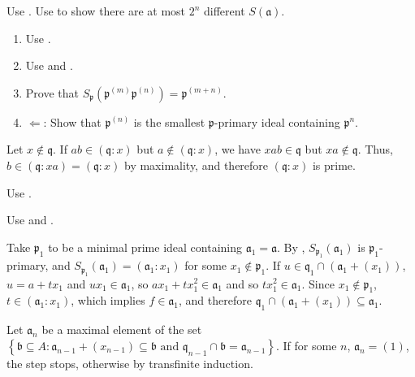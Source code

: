 \begin{exercise}\label{ex4.12}
	Use . Use  to show there are at most $2^n$ different $S(\mathfrak{a})$.
\end{exercise}

\begin{exercise}\label{ex4.13}
	\begin{enumerate}[label=(\roman*),ref=\theexercise(\roman*)]
		\item Use .
		\item Use  and .
		\item Prove that $S_\mathfrak{p}\left(\mathfrak{p}^{(m)}\mathfrak{p}^{(n)}\right)=\mathfrak{p}^{(m+n)}$.
		\item$\Leftarrow$: Show that $\mathfrak{p}^{(n)}$ is the smallest $\mathfrak{p}$-primary ideal containing $\mathfrak{p}^n$.
	\end{enumerate}
\end{exercise}

\begin{exercise}\label{ex4.14}
	Let $x\notin\mathfrak{q}$. If $ab\in(\mathfrak{q}:x)$ but $a\notin(\mathfrak{q}:x)$, we have $xab\in\mathfrak{q}$ but $xa\notin\mathfrak{q}$. Thus, $b\in(\mathfrak{q}:xa)=(\mathfrak{q}:x)$ by maximality, and therefore $(\mathfrak{q}:x)$ is prime.
\end{exercise}

\begin{exercise}\label{ex4.15}
	Use .
\end{exercise}

\begin{exercise}\label{ex4.16}
	Use  and .
\end{exercise}

\begin{exercise}\label{ex4.17}
	Take $\mathfrak{p}_1$ to be a minimal prime ideal containing $\mathfrak{a}_1=\mathfrak{a}$. By , $S_{\mathfrak{p}_1}\left(\mathfrak{a}_1\right)$ is $\mathfrak{p}_1$-primary, and $S_{\mathfrak{p}_1}\left(\mathfrak{a}_1\right)=\left(\mathfrak{a}_1:x_1\right)$ for some $x_1\notin\mathfrak{p}_1$. If $u\in\mathfrak{q}_1\cap\left(\mathfrak{a}_1+\left(x_1\right)\right)$, $u=a+tx_1$ and $ux_1\in\mathfrak{a}_1$, so $ax_1+tx_1^2\in\mathfrak{a}_1$ and so $tx_1^2\in\mathfrak{a}_1$. Since $x_1\notin\mathfrak{p}_1$, $t\in\left(\mathfrak{a}_1:x_1\right)$, which implies $f\in\mathfrak{a}_1$, and therefore $\mathfrak{q}_1\cap\left(\mathfrak{a}_1+\left(x_1\right)\right)\subseteq\mathfrak{a}_1$.
	
	Let $\mathfrak{a}_n$ be a maximal element of the set $\left\{\mathfrak{b}\subseteq A:\mathfrak{a}_{n-1}+\left(x_{n-1}\right)\subseteq\mathfrak{b}\text{ and }\mathfrak{q}_{n-1}\cap\mathfrak{b}=\mathfrak{a}_{n-1}\right\}$. If for some $n$, $\mathfrak{a}_n=(1)$, the step stops, otherwise by transfinite induction.
\end{exercise}


